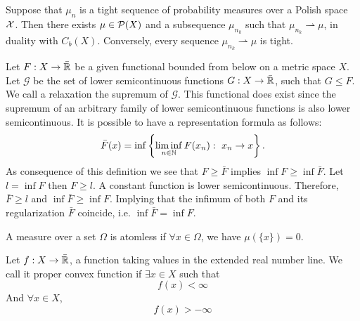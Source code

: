 \begin{theorem}[Prokhorov]
	Suppose that $\mu_n $ is a tight sequence of probability measures over a Polish space $\mathcal{X}$. Then there exists $\mu\in\mathcal{P}(X)$ and a subsequence $\mu_{n_k}$ such that $\mu_{n_k}\rightharpoonup \mu $, in duality with $C_b(X)$. Conversely, every sequence $\mu_{n_k}\rightharpoonup \mu$ is tight.
\end{theorem}

\begin{definition}
	Let $F:X\rightarrow \bar{\mathbb{R}}$ be a given functional bounded from below on a metric space $X$.  Let $\mathcal G$ be the set of lower semicontinuous functions $G: X\rightarrow \bar{\mathbb{R}}$, such that $G\leq F$. We call a relaxation the supremum of $\mathcal G$.  This functional does exist since the supremum of an arbitrary family of lower semicontinuous functions is also lower semicontinuous. It is possible to have a representation formula as follows:
	\begin{equation}
		\bar F(x) = \inf \left\lbrace \liminf_{n\in \mathbb{N}} F(x_n):\ x_n\rightarrow x \right\rbrace.
	\end{equation}
	As consequence of this definition we see that $F \geq \bar F$ implies $\inf F \geq \inf \bar F$. Let $l=\inf F$ then $F\geq l$. A constant function is lower semicontinuous. Therefore, $\bar F \geq l$ and $\inf \bar F \geq \inf F$. Implying that the infimum of both $F$ and its regularization $\bar F$ coincide, i.e. $\inf \bar F = \inf F$. 
\end{definition}
\begin{definition}
	A measure over a set $\Omega$ is atomless if $\forall x \in \Omega$, we have  $\mu(\{x\})=0$.
\end{definition}
\begin{definition}
	Let $f: X\rightarrow\bar{\mathbb{R}}$, a function taking values in the extended real number line. We call it proper convex function if $\exists x \in X$ such that 
	\begin{equation*}
		f(x)<\infty
	\end{equation*}
	And $\forall x \in X$,
	\begin{equation}
		f(x)>-\infty
	\end{equation}
\end{definition}
